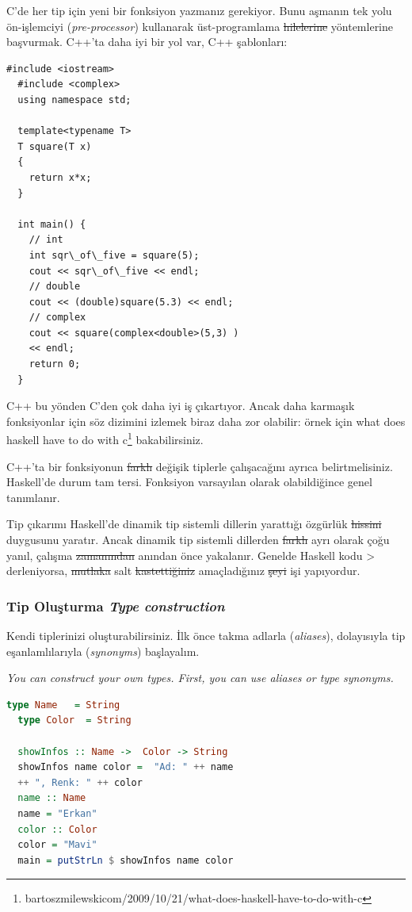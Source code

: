 \documentclass[a4paper,14pt,openany]{extbook} %
\let\emph\textit
\begin{document}
C'de her tip için yeni bir fonksiyon yazmanız gerekiyor. Bunu aşmanın
tek yolu ön-işlemciyi (\emph{pre-processor}) kullanarak üst-programlama \st{hilelerine} yöntemlerine başvurmak.
C++'ta daha iyi bir yol var, C++ şablonları:

\begin{lstlisting}[language= {[ANSI]C++},tabsize=2,escapeinside=||]
  #include <iostream>
  #include <complex>
  using namespace std;

  template<typename T>
  T square(T x)
  {
    return x*x;
  }

  int main() {
    // int
    int sqr\_of\_five = square(5);
    cout << sqr\_of\_five << endl;
    // double
    cout << (double)square(5.3) << endl;
    // complex
    cout << square(complex<double>(5,3) )
    << endl;
    return 0;
  }
\end{lstlisting}

C++ bu yönden C'den çok daha iyi iş çıkartıyor. Ancak daha karmaşık
fonksiyonlar için söz dizimini izlemek biraz daha zor olabilir:
örnek için
{\color{blue} what does haskell have to do with c}\footnote{bartoszmilewski\centerdot com/2009/10/21/what-does-haskell-have-to-do-with-c} bakabilirsiniz.

C++'ta bir fonksiyonun \st{farklı} değişik tiplerle çalışacağını ayrıca
belirtmelisiniz. Haskell'de durum tam tersi. Fonksiyon varsayılan olarak
olabildiğince genel tanımlanır.

Tip çıkarımı Haskell'de dinamik tip sistemli dillerin yarattığı özgürlük
\st{hissini} duygusunu yaratır. Ancak dinamik tip sistemli dillerden \st{farklı} ayrı olarak çoğu yanıl, çalışma \st{zamanından} anından önce yakalanır. Genelde Haskell kodu
\textgreater{} derleniyorsa, \st{mutlaka} salt \st{kastettiğiniz} amaçladığınız \st{şeyi} işi yapıyordur.

\subsubsection{Tip Oluşturma \emph{Type construction}}\label{tip-oluux15fturma}

Kendi tiplerinizi oluşturabilirsiniz. İlk önce takma adlarla (\emph{aliases}), dolayısıyla tip
eşanlamlılarıyla (\emph{synonyms}) başlayalım.

\emph{\small You can construct your own types. First, you can use aliases or type synonyms.}

\begin{lstlisting}[language=Haskell]
  type Name   = String
  type Color  = String

  showInfos :: Name ->  Color -> String
  showInfos name color =  "Ad: " ++ name
  ++ ", Renk: " ++ color
  name :: Name
  name = "Erkan"
  color :: Color
  color = "Mavi"
  main = putStrLn $ showInfos name color
\end{lstlisting}
\end{document}
